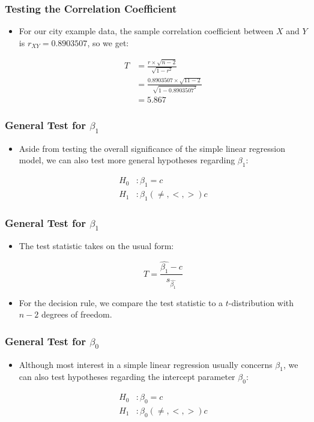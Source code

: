 \documentclass[12pt]{beamer}
\begin{document}
	\begin{frame}
		\frametitle{Testing the Correlation Coefficient}
		
		\begin{itemize}[label={\color{blue}$\blacktriangleright$}]
			\item For our city example data, the sample correlation coefficient between $X$ and $Y$ is $r_{XY} = 0.8903507$, so we get:
			
			\[
			\begin{aligned}
				T &= \frac{r \times \sqrt{n-2}}{\sqrt{1-r^2}} \\[2ex]
				&= \frac{0.8903507 \times \sqrt{11-2}}{\sqrt{1-0.8903507^2}} \\[2ex]
				&= 5.867
			\end{aligned}
			\]
		\end{itemize}
	\end{frame}
	\begin{frame}
		\frametitle{General Test for $\beta_1$}
		
		\begin{itemize}[label={\color{blue}$\blacktriangleright$}]
			\item Aside from testing the overall significance of the simple linear regression model, we can also test more general hypotheses regarding $\beta_1$:
			
			\[
			\begin{aligned}
				H_0 &: \beta_1 = c \\[2ex]
				H_1 &: \beta_1(\neq,<,>)c
			\end{aligned}
			\]
		\end{itemize}
	\end{frame}
	\begin{frame}
		\frametitle{General Test for $\beta_1$}
		
		\begin{itemize}[label={\color{blue}$\blacktriangleright$}]
			\item The test statistic takes on the usual form:
			
			\[
			T = \frac{\hat{\beta_1} - c}{s_{\hat{\beta_1}}}
			\]
			
			\item For the decision rule, we compare the test statistic to a $t$-distribution with $n-2$ degrees of freedom.
		\end{itemize}
	\end{frame}
	\begin{frame}
		\frametitle{General Test for $\beta_0$}
		
		\begin{itemize}[label={\color{blue}$\blacktriangleright$}]
			\item Although most interest in a simple linear regression usually concerns $\beta_1$, we can also test hypotheses regarding the intercept parameter $\beta_0$:
			
			\[
			\begin{aligned}
				H_0 &: \beta_0 = c \\[2ex]
				H_1 &: \beta_0(\neq,<,>)c
			\end{aligned}
			\]
		\end{itemize}
	\end{frame}
\end{document}
